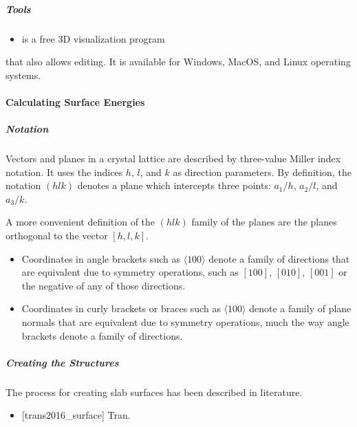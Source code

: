 \documentclass[letterpaper,10pt,english]{sphinxmanual}
\begin{document}
\subparagraph{Tools}
\label{\detokenize{calc_material_properties/calc_bulk_properties:tools}}\begin{itemize}
\item {} 
 is a free 3D visualization program

\end{itemize}

that also allows editing.  It is available for Windows, MacOS, and Linux operating systems.


\paragraph{Calculating Surface Energies}
\label{\detokenize{calc_material_properties/calc_surface_energy:calculating-surface-energies}}\label{\detokenize{calc_material_properties/calc_surface_energy:calc-surface-energy}}\label{\detokenize{calc_material_properties/calc_surface_energy::doc}}

\subparagraph{Notation}
\label{\detokenize{calc_material_properties/calc_surface_energy:notation}}
Vectors and planes in a crystal lattice are described by three-value Miller index notation.  It uses
the indices \(h\), \(l\), and \(k\) as direction parameters.  By definition, the notation \((hlk)\)
denotes a plane which intercepts three points: \(a_1/h\), \(a_2/l\), and \(a_3/k\).

A more convenient definition of the \((hlk)\) family of the planes are the planes orthogonal to the vector \([h,l,k]\).
\begin{itemize}
\item {} 
Coordinates in angle brackets such as \(\langle 100 \rangle\) denote a family of directions that are equivalent due to symmetry operations, such as \([100]\), \([010]\), \([001]\) or the negative of any of those directions.

\item {} 
Coordinates in curly brackets or braces such as \(\langle 100 \rangle\) denote a family of plane normals that are equivalent due to symmetry operations, much the way angle brackets denote a family of directions.

\end{itemize}


\subparagraph{Creating the Structures}
\label{\detokenize{calc_material_properties/calc_surface_energy:creating-the-structures}}
The process for creating slab surfaces has been described in literature.
\begin{itemize}
\item {} 
{[}trans2016\_surface{]} Tran.

\end{itemize}
\end{document}
